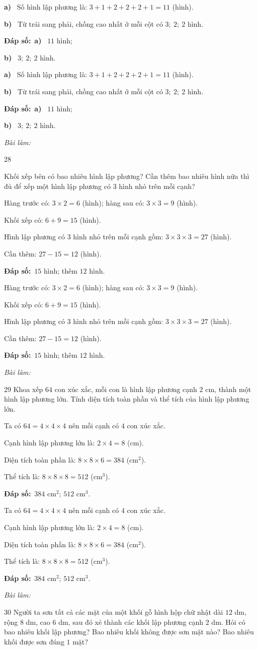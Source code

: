 \documentclass[11pt]{article}
\newif\ifsol \soltrue
\providecommand{\AnsWord}{Đáp số}
\newcommand{\dapso}[1]{\par\textbf{\AnsWord:}\ #1}
\newcommand{\probsol}[1]{%
  \begin{lrbox}{\solmeasure}\begin{minipage}{\dimexpr\linewidth-24pt\relax}#1\end{minipage}\end{lrbox}%
  \ifsol
    \begin{solbox}#1\end{solbox}%
  \else
    \setlength{\solht}{\dimexpr\ht\solmeasure+\dp\solmeasure+0.85cm\relax}%
    \ifdim\solht<1.35cm\setlength{\solht}{1.35cm}\fi
    \begin{tcolorbox}[colback=white,colframe=Line,boxrule=0.8pt,arc=5pt,
      left=8pt,right=8pt,top=4pt,bottom=4pt,height=\solht]{\footnotesize\color{Slate}\itshape\WorkWord}\end{tcolorbox}%
  \fi}
\newcommand{\pa}[1]{\textbf{#1)}\ }
\newcommand{\gap}{\vspace{0.3cm}}
\def\WorkWord{Bài làm:}
\def\AnsWord{Đáp số}
\begin{document}
\probsol{
\pa{a} Số hình lập phương là: $3+1+2+2+2+1=11$ (hình).\par
\pa{b} Từ trái sang phải, chồng cao nhất ở mỗi cột có $3;\ 2;\ 2$ hình.
\dapso{\pa{a} $11$ hình;\par \pa{b} $3;\ 2;\ 2$ hình.}}
\gap
\begin{probbox}{28}{\relax}
\begin{minipage}[t]{0.6\linewidth}
Khối xếp bên có bao nhiêu hình lập phương? Cần thêm bao nhiêu hình nữa thì đủ để xếp một hình lập phương có $3$ hình nhỏ trên mỗi cạnh?
\end{minipage}\hfill
\begin{minipage}[t]{0.36\linewidth}\vspace{0pt}\centering
{}
\end{minipage}
\end{probbox}
\probsol{
Hàng trước có: $3\times2=6$ (hình); hàng sau có: $3\times3=9$ (hình).\par
Khối xếp có: $6+9=15$ (hình).\par
Hình lập phương có $3$ hình nhỏ trên mỗi cạnh gồm: $3\times3\times3=27$ (hình).\par
Cần thêm: $27-15=12$ (hình).
\dapso{$15$ hình; thêm $12$ hình.}}
\gap
\begin{probbox}{29}{\relax}
Khoa xếp $64$ con xúc xắc, mỗi con là hình lập phương cạnh $2$ cm, thành một hình lập phương lớn. Tính diện tích toàn phần và thể tích của hình lập phương lớn.
\end{probbox}
\probsol{
Ta có $64=4\times4\times4$ nên mỗi cạnh có $4$ con xúc xắc.\par
Cạnh hình lập phương lớn là: $2\times4=8$ (cm).\par
Diện tích toàn phần là: $8\times8\times6=384$ (cm$^2$).\par
Thể tích là: $8\times8\times8=512$ (cm$^3$).
\dapso{$384$ cm$^2$; $512$ cm$^3$.}}
\gap
\begin{probbox}{30}{\relax}
Người ta sơn tất cả các mặt của một khối gỗ hình hộp chữ nhật dài $12$ dm, rộng $8$ dm, cao $6$ dm, sau đó xẻ thành các khối lập phương cạnh $2$ dm. Hỏi có bao nhiêu khối lập phương? Bao nhiêu khối không được sơn mặt nào? Bao nhiêu khối được sơn đúng $1$ mặt?
\end{probbox}
\end{document}
